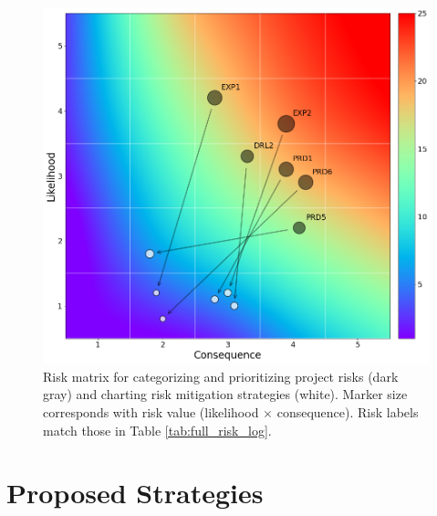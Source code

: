 \begin{figure}[htp]
\centering
\includegraphics[width=\linewidth]{templates/images/Figure-Risk_Matrix.png}
\caption[Risk matrix]{Risk matrix for categorizing and prioritizing project risks (dark gray) and charting risk mitigation strategies (white). Marker size corresponds with risk value (likelihood $\times$ consequence). Risk labels match those in Table \ref{tab:full_risk_log}.}
\label{fig:risk_matrix}
\end{figure}




\section{Proposed Strategies}
